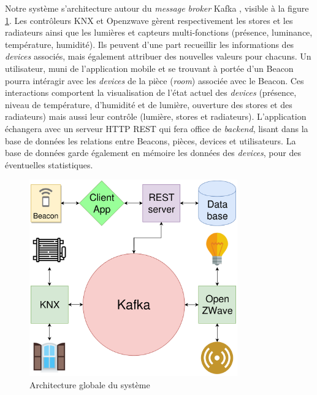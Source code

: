 Notre système s'architecture autour du \textit{message broker} Kafka \cite{kafka}, visible à la figure \ref{shema_general}. Les contrôleurs KNX et Openzwave gèrent respectivement les stores et les radiateurs ainsi que les lumières et capteurs multi-fonctions (présence, luminance, température, humidité). Ils peuvent d'une part recueillir les informations des \textit{devices} associés, mais également attribuer des nouvelles valeurs pour chacuns. Un utilisateur, muni de l'application mobile et se trouvant à portée d'un Beacon pourra intéragir avec les \textit{devices} de la pièce (\textit{room}) associée avec le Beacon. Ces interactions comportent la visualisation de l'état actuel des \textit{devices} (présence, niveau de température, d'humidité et de lumière, ouverture des stores et des radiateurs) mais aussi leur contrôle (lumière, stores et radiateurs). L'application échangera avec un serveur HTTP REST qui fera office de \textit{backend}, lisant dans la base de données les relations entre Beacons, pièces, devices et utilisateurs. La base de données garde également en mémoire les données des \textit{devices}, pour des éventuelles statistiques.

\begin{figure}
    \begin{center}
        \includegraphics[width=0.8\textwidth]{img/general.png}
    \end{center}
    \caption{Architecture globale du système}
    \label{shema_general}
\end{figure}
